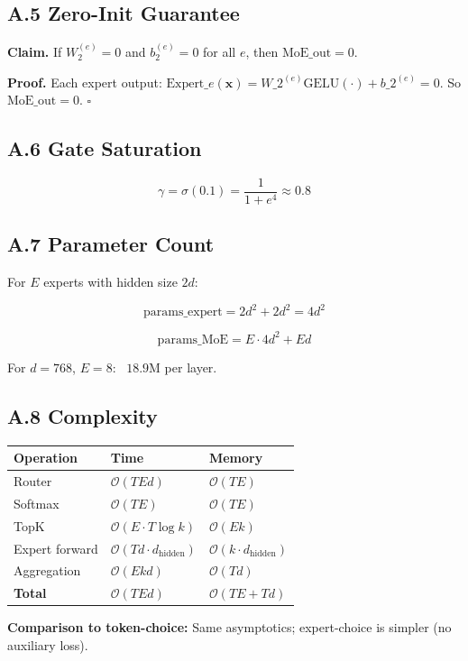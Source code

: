 \subsection{A.5 Zero-Init Guarantee}

\textbf{Claim.} If $W_2^{(e)} = 0$ and $b_2^{(e)} = 0$ for all $e$, then 
$\text{MoE\_out} = 0$.

\textbf{Proof.} Each expert output: $\text{Expert}\_e(\mathbf{x}) = W\_2^{(e)} 
\text{GELU}(\cdot) + b\_2^{(e)} = 0$. So $\text{MoE\_out} = 0$. $\square$

\subsection{A.6 Gate Saturation}

\[
\gamma = \sigma(0.1) = \frac{1}{1 + e^{4}} \approx 0.8
\tag{A.7}
\]

\subsection{A.7 Parameter Count}

For $E$ experts with hidden size $2d$:

\[
\text{params}\_\text{expert} = 2 d^2 + 2 d^2 = 4 d^2
\tag{A.8}
\]

\[
\text{params}\_\text{MoE} = E \cdot 4 d^2 + E d
\tag{A.9}
\]

For $d = 768$, $E = 8$: ~$18.9$M per layer.

\subsection{A.8 Complexity}

\begin{table}[H]
\centering
\small
\begin{tabular}{lll}
\toprule
\textbf{Operation} & \textbf{Time} & \textbf{Memory} \\
\midrule
Router & $\mathcal{O}(T E d)$ & $\mathcal{O}(T E)$ \\
Softmax & $\mathcal{O}(T E)$ & $\mathcal{O}(T E)$ \\
TopK & $\mathcal{O}(E \cdot T \log k)$ & $\mathcal{O}(E k)$ \\
Expert forward & $\mathcal{O}(T d \cdot d_\text{hidden})$ & $\mathcal{O}(k \cdot d_\text{hidden})$ \\
Aggregation & $\mathcal{O}(E k d)$ & $\mathcal{O}(T d)$ \\
\textbf{Total} & $\mathcal{O}(T E d)$ & $\mathcal{O}(T E + T d)$ \\
\bottomrule
\end{tabular}
\end{table}

\textbf{Comparison to token-choice:} Same asymptotics; expert-choice is simpler 
(no auxiliary loss).

